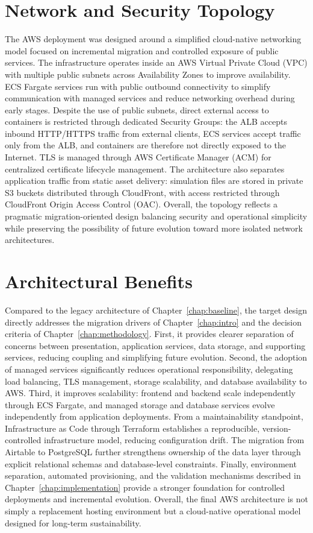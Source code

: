 \section{Network and Security Topology}
The AWS deployment was designed around a simplified cloud-native networking model focused on incremental migration and controlled exposure of public services. The infrastructure operates inside an AWS Virtual Private Cloud (VPC) with multiple public subnets across Availability Zones to improve availability. ECS Fargate services run with public outbound connectivity to simplify communication with managed services and reduce networking overhead during early stages. Despite the use of public subnets, direct external access to containers is restricted through dedicated Security Groups: the ALB accepts inbound HTTP/HTTPS traffic from external clients, ECS services accept traffic only from the ALB, and containers are therefore not directly exposed to the Internet. TLS is managed through AWS Certificate Manager (ACM) for centralized certificate lifecycle management. The architecture also separates application traffic from static asset delivery: simulation files are stored in private S3 buckets distributed through CloudFront, with access restricted through CloudFront Origin Access Control (OAC). Overall, the topology reflects a pragmatic migration-oriented design balancing security and operational simplicity while preserving the possibility of future evolution toward more isolated network architectures.

\section{Architectural Benefits}
Compared to the legacy architecture of Chapter~\ref{chap:baseline}, the target design directly addresses the migration drivers of Chapter~\ref{chap:intro} and the decision criteria of Chapter~\ref{chap:methodology}. First, it provides clearer separation of concerns between presentation, application services, data storage, and supporting services, reducing coupling and simplifying future evolution. Second, the adoption of managed services significantly reduces operational responsibility, delegating load balancing, TLS management, storage scalability, and database availability to AWS. Third, it improves scalability: frontend and backend scale independently through ECS Fargate, and managed storage and database services evolve independently from application deployments. From a maintainability standpoint, Infrastructure as Code through Terraform establishes a reproducible, version-controlled infrastructure model, reducing configuration drift. The migration from Airtable to PostgreSQL further strengthens ownership of the data layer through explicit relational schemas and database-level constraints. Finally, environment separation, automated provisioning, and the validation mechanisms described in Chapter~\ref{chap:implementation} provide a stronger foundation for controlled deployments and incremental evolution. Overall, the final AWS architecture is not simply a replacement hosting environment but a cloud-native operational model designed for long-term sustainability.
